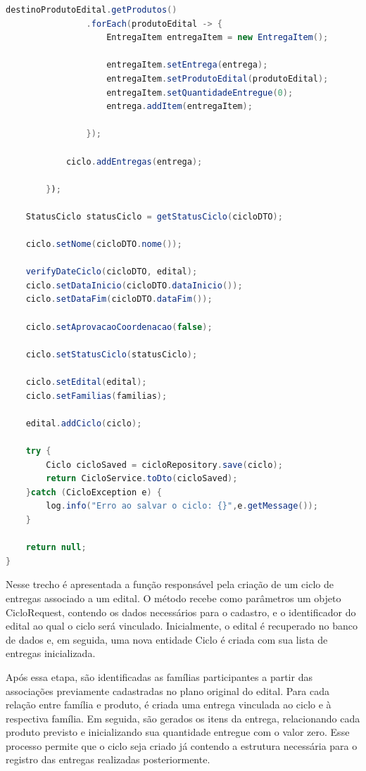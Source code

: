 \begin{lstlisting}[language=Java, caption={Serviço para criação de ciclos dentro do sistema}, label={lst:servico_criar_ciclo}]
            destinoProdutoEdital.getProdutos()
                .forEach(produtoEdital -> {
                    EntregaItem entregaItem = new EntregaItem();

                    entregaItem.setEntrega(entrega);
                    entregaItem.setProdutoEdital(produtoEdital);
                    entregaItem.setQuantidadeEntregue(0);
                    entrega.addItem(entregaItem);

                });

            ciclo.addEntregas(entrega);

        });
    
    StatusCiclo statusCiclo = getStatusCiclo(cicloDTO);

    ciclo.setNome(cicloDTO.nome());

    verifyDateCiclo(cicloDTO, edital);
    ciclo.setDataInicio(cicloDTO.dataInicio());
    ciclo.setDataFim(cicloDTO.dataFim());

    ciclo.setAprovacaoCoordenacao(false);

    ciclo.setStatusCiclo(statusCiclo);

    ciclo.setEdital(edital);
    ciclo.setFamilias(familias);

    edital.addCiclo(ciclo);

    try {
        Ciclo cicloSaved = cicloRepository.save(ciclo);
        return CicloService.toDto(cicloSaved);
    }catch (CicloException e) {
        log.info("Erro ao salvar o ciclo: {}",e.getMessage());
    }

    return null;
}
\end{lstlisting}

Nesse trecho é apresentada a função responsável pela criação de um ciclo de entregas associado a um edital. O método recebe como parâmetros um objeto CicloRequest, contendo os dados necessários para o cadastro, e o identificador do edital ao qual o ciclo será vinculado. Inicialmente, o edital é recuperado no banco de dados e, em seguida, uma nova entidade Ciclo é criada com sua lista de entregas inicializada.

Após essa etapa, são identificadas as famílias participantes a partir das associações previamente cadastradas no plano original do edital. Para cada relação entre família e produto, é criada uma entrega vinculada ao ciclo e à respectiva família. Em seguida, são gerados os itens da entrega, relacionando cada produto previsto e inicializando sua quantidade entregue com o valor zero. Esse processo permite que o ciclo seja criado já contendo a estrutura necessária para o registro das entregas realizadas posteriormente.

